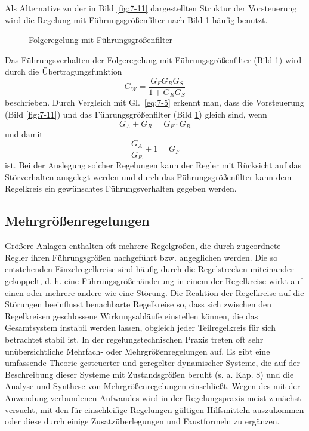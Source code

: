 Als Alternative zu der in Bild \ref{fig:7-11} dargestellten Struktur der Vorsteuerung wird die Regelung mit Führungsgrößenfilter nach Bild \ref{fig:7-13} häufig benutzt.

\begin{figure}[ht]
    \centering
    \caption{Folgeregelung mit Führungsgrößenfilter}
    \label{fig:7-13}
\end{figure}

Das Führungsverhalten der Folgeregelung mit Führungsgrößenfilter (Bild \ref{fig:7-13}) wird durch die Übertragungsfunktion
\begin{equation}
    G_W = \frac{G_F G_R G_S}{1 + G_R G_S}
\end{equation}
beschrieben.
Durch Vergleich mit Gl.~\eqref{eq:7-5} erkennt man, dass die Vorsteuerung (Bild \ref{fig:7-11}) und das Führungsgrößenfilter (Bild \ref{fig:7-13}) gleich sind, wenn
\begin{equation}
    G_A + G_R = G_F \cdot G_R
\end{equation}
und damit
\begin{equation}
    \frac{G_A}{G_R} + 1 = G_F
\end{equation}
ist.
Bei der Auslegung solcher Regelungen kann der Regler mit Rücksicht auf das Störverhalten ausgelegt werden und durch das Führungsgrößenfilter kann dem Regelkreis ein gewünschtes Führungsverhalten gegeben werden.


\subsection{Mehrgrößenregelungen}

Größere Anlagen enthalten oft mehrere Regelgrößen, die durch zugeordnete Regler ihren Führungsgrößen nachgeführt bzw. angeglichen werden.
Die so entstehenden Einzelregelkreise sind häufig durch die Regelstrecken miteinander gekoppelt, d. h. eine Führungsgrößenänderung in einem der Regelkreise wirkt auf einen oder mehrere andere wie eine Störung.
Die Reaktion der Regelkreise auf die Störungen beeinflusst benachbarte Regelkreise so, dass sich zwischen den Regelkreisen geschlossene Wirkungsabläufe einstellen können, die das Gesamtsystem instabil werden lassen, obgleich jeder Teilregelkreis für sich betrachtet stabil ist.
In der regelungstechnischen Praxis treten oft sehr unübersichtliche Mehrfach- oder Mehrgrößenregelungen auf.
Es gibt eine umfassende Theorie gesteuerter und geregelter dynamischer Systeme, die auf der Beschreibung dieser Systeme mit Zustandsgrößen beruht (s. a. Kap. 8) und die Analyse und Synthese von Mehrgrößenregelungen einschließt.
Wegen des mit der Anwendung verbundenen Aufwandes wird in der Regelungspraxis meist zunächst versucht, mit den für einschleifige Regelungen gültigen Hilfsmitteln auszukommen oder diese durch einige Zusatzüberlegungen und Faustformeln zu ergänzen.

